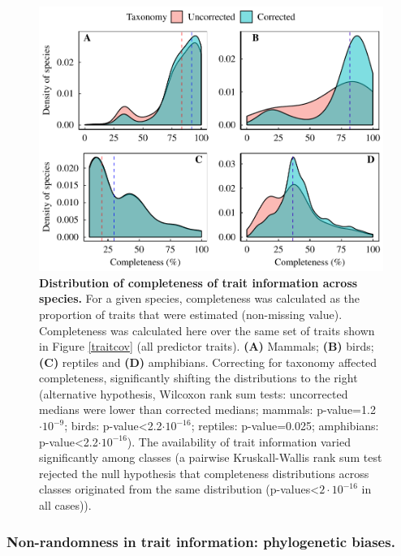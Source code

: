 \begin{figure}[h]
\centering
\includegraphics[scale=0.70]{figures/chapter2/Trait_coverage/Missing_values/Traitcompleteness}
\caption[Distribution of completeness of trait information across species]{\textbf{Distribution of completeness of trait information across species.} For a given species, completeness was calculated as the proportion of traits that were estimated (non-missing value). Completeness was calculated here over the same set of traits shown in Figure \ref{traitcov} (all predictor traits). \textbf{(A)} Mammals; \textbf{(B)} birds; \textbf{(C)} reptiles and \textbf{(D)} amphibians. Correcting for taxonomy affected completeness, significantly shifting the distributions to the right (alternative hypothesis, Wilcoxon rank sum tests: uncorrected medians were lower than corrected medians; mammals: p-value=1.2$\cdot10^{-9}$; birds: p-value<2.2$\cdot10^{-16}$; reptiles: p-value=0.025; amphibians: p-value<2.2$\cdot10^{-16}$). The availability of trait information varied significantly among classes (a pairwise Kruskall-Wallis rank sum test rejected the null hypothesis that completeness distributions across classes originated from the same distribution (p-values<$2\cdot10^{-16}$ in all cases)).}
\label{traitcomp}
\end{figure}


\newpage
\subsubsection{Non-randomness in trait information: phylogenetic biases.}

